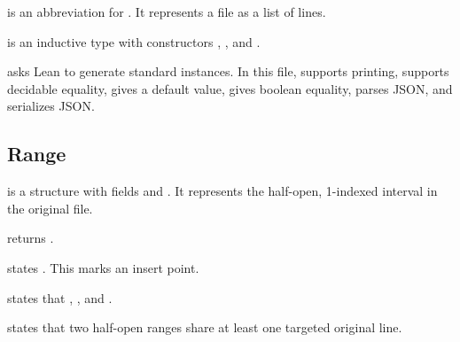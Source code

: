 \begin{definition}[BaseFile]
\code{[BaseFile]} is an abbreviation for . It represents a
file as a list of lines.
\end{definition}

\begin{definition}[Op]
\code{[Op]} is an inductive type with constructors ,
, and .
\end{definition}

\begin{definition}[deriving]
\code{[deriving]} asks Lean to generate standard instances. In this file,
 supports printing,  supports decidable equality,
 gives a default value,  gives boolean equality,
 parses JSON, and  serializes JSON.
\end{definition}

\subsection{Range}

\begin{definition}[Range]
\code{[Range]} is a structure with fields  and
. It represents the half-open, 1-indexed interval
\code{[start, stop)} in the original file.
\end{definition}

\begin{definition}
 returns .
\end{definition}

\begin{definition}
 states . This marks an insert
point.
\end{definition}

\begin{definition}
 states that ,
, and .
\end{definition}

\begin{definition}
 states that two half-open ranges share at least one
targeted original line.
\end{definition}

